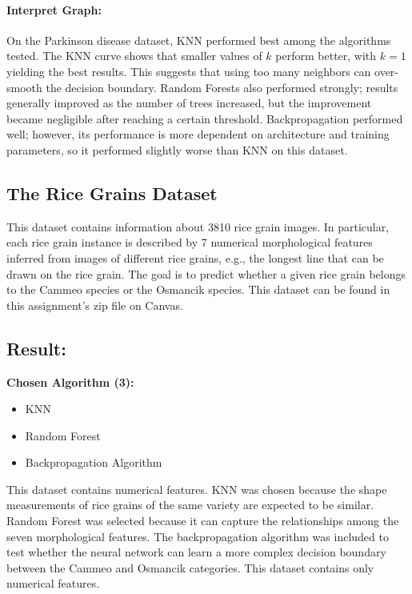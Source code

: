 \documentclass[11pt]{article}
\begin{document}
\paragraph{Interpret Graph:} On the Parkinson disease dataset, KNN performed best among the algorithms tested. The KNN curve shows that smaller values of $k$ perform better, with $k=1$ yielding the best results. This suggests that using too many neighbors can over-smooth the decision boundary. Random Forests also performed strongly; results generally improved as the number of trees increased, but the improvement became negligible after reaching a certain threshold. Backpropagation performed well; however, its performance is more dependent on architecture and training parameters, so it performed slightly worse than KNN on this dataset.

\newpage

\subsection{The Rice Grains Dataset}

This dataset contains information about 3810 rice grain images. In particular, each rice grain instance is described by 7 numerical morphological features inferred from images of different rice grains, e.g., the longest line that can be drawn on the rice grain. The goal is to predict whether a given rice grain belongs to the Cammeo species or the Osmancik species. This dataset can be found in this assignment's zip file on Canvas.


\noindent \subsection*{Result:}

\noindent \textbf{Chosen Algorithm (3):}
\begin{itemize}
    \item KNN
    \item Random Forest
    \item Backpropagation Algorithm
\end{itemize}

\noindent {}

\noindent This dataset contains numerical features. KNN was chosen because the shape measurements of rice grains of the same variety are expected to be similar. Random Forest was selected because it can capture the relationships among the seven morphological features. The backpropagation algorithm was included to test whether the neural network can learn a more complex decision boundary between the Cammeo and Osmancik categories. This dataset contains only numerical features.\\
\end{document}
